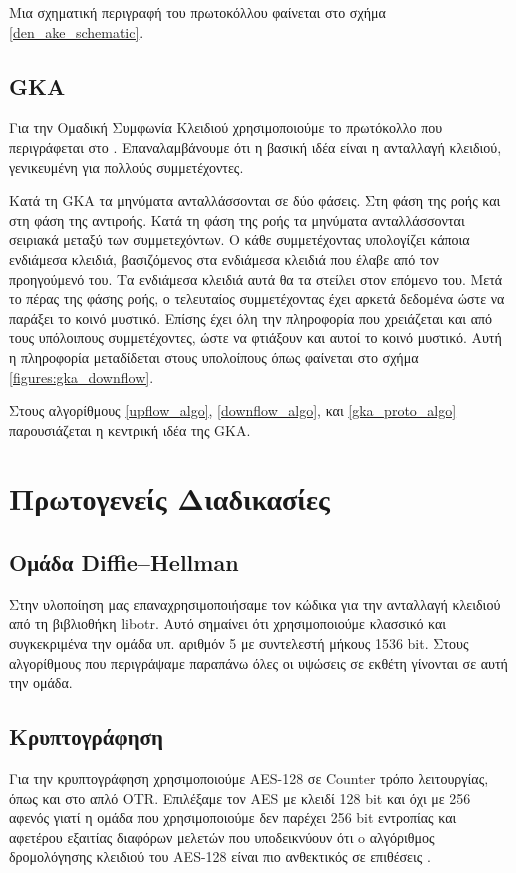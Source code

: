 Μια σχηματική περιγραφή του πρωτοκόλλου φαίνεται στο σχήμα \ref{den_ake_schematic}.


\subsection{GKA}
\label{gka_subprot}


Για την Ομαδική Συμφωνία Κλειδιού χρησιμοποιούμε το πρωτόκολλο που περιγράφεται στο \cite{mpenc}.
Επαναλαμβάνουμε ότι η βασική ιδέα είναι η \dhname ανταλλαγή κλειδιού, γενικευμένη για πολλούς συμμετέχοντες.

Κατά τη GKA τα μηνύματα ανταλλάσσονται σε δύο φάσεις. Στη φάση της ροής και στη φάση της αντιροής.
Κατά τη φάση της ροής τα μηνύματα ανταλλάσσονται σειριακά μεταξύ των συμμετεχόντων.
Ο κάθε συμμετέχοντας υπολογίζει κάποια ενδιάμεσα κλειδιά, βασιζόμενος στα ενδιάμεσα κλειδιά που έλαβε από τον προηγούμενό του.
Τα ενδιάμεσα κλειδιά αυτά θα τα στείλει στον επόμενο του.
Μετά το πέρας της φάσης ροής, ο τελευταίος συμμετέχοντας έχει αρκετά δεδομένα ώστε να παράξει το κοινό μυστικό.
Επίσης έχει όλη την πληροφορία που χρειάζεται και από τους υπόλοιπους συμμετέχοντες, ώστε να φτιάξουν και αυτοί το κοινό μυστικό.
Αυτή η πληροφορία μεταδίδεται στους υπολοίπους όπως φαίνεται στο σχήμα \ref{figures:gka_downflow}.

Στους αλγορίθμους \ref{upflow_algo}, \ref{downflow_algo}, και \ref{gka_proto_algo} παρουσιάζεται η κεντρική ιδέα της GKA.


\section{Πρωτογενείς Διαδικασίες}

\subsection{Ομάδα Diffie--Hellman}

Στην υλοποίηση μας επαναχρησιμοποιήσαμε τον κώδικα για την ανταλλαγή κλειδιού \dhname από τη βιβλιοθήκη libotr.
Αυτό σημαίνει ότι χρησιμοποιούμε κλασσικό \dhname και συγκεκριμένα την ομάδα υπ. αριθμόν 5 με συντελεστή μήκους 1536 bit.
Στους αλγορίθμους που περιγράψαμε παραπάνω όλες οι υψώσεις σε εκθέτη γίνονται σε αυτή την ομάδα.

\subsection{Κρυπτογράφηση}

Για την κρυπτογράφηση χρησιμοποιούμε AES-128 σε Counter τρόπο λειτουργίας, όπως και στο απλό OTR.
Επιλέξαμε τον AES με κλειδί 128 bit και όχι με 256 αφενός γιατί η ομάδα \dhname που χρησιμοποιούμε δεν παρέχει 256 bit εντροπίας και αφετέρου εξαιτίας διαφόρων μελετών που υποδεικνύουν ότι o αλγόριθμος δρομολόγησης κλειδιού του AES-128 είναι πιο ανθεκτικός σε επιθέσεις \cite{aes-key-recov} \cite{rijndael-improved-analysis}.

